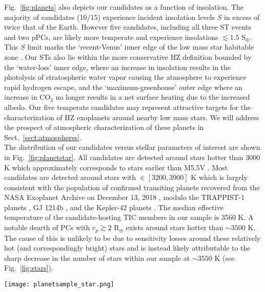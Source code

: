 Fig.~\ref{fig:planets} also depicts our candidates as a function of insolation. The majority of candidates
(10/15) experience incident insolation levels $S$ in excess of twice that of the Earth. However five candidates,
including all three ST events and two pPCs, are likely more temperate and experience insolations
$\lesssim 1.5$ S$_{\oplus}$.
This $S$ limit marks the `recent-Venus' inner edge of the low mass star habitable zone \citep[HZ;][]{kopparapu13}.
Our STs also lie within the more conservative HZ definition bounded by the `water-loss' inner
edge, where an increase in insolation results in the photolysis of stratospheric water vapor causing the atmosphere
to experience rapid hydrogen escape, and the `maximum-greenhouse' outer edge where an increase in CO$_2$ no longer
results in a net surface heating due to the increased albedo. Our five temperate candidates may represent attractive
targets for the characterization of HZ exoplanets around nearby low mass stars. We will address the prospect of
atmospheric characterization of these planets in Sect.~\ref{sect:atmospheres}. \\

The distribution of our candidates versus stellar parameters of interest are shown in
Fig.~\ref{fig:planetstar}. All candidates are detected around stars hotter than 3000 K which
approximately corresponds to stars earlier than M5.5V \citep{pecaut13}. Most candidates
are detected around stars with \teff{} $\in [3200,3900]$ K which is largely consistent with the
population of confirmed transiting planets recovered from the NASA Exoplanet Archive on
December 13, 2018 \citep{akeson13}, modulo the TRAPPIST-1 planets \citep{gillon17}, GJ 1214b
\citep{charbonneau09}, and the Kepler-42 planets \citep{muirhead12b}. The median effective
temperature of the candidate-hosting TIC members in our sample is 3560 K. A notable dearth of PCs
with $r_p \gtrsim 2$ R$_{\oplus}$ exists around stars hotter than $\sim 3500$ K. The cause of
this is unlikely to be due to sensitivity losses around these relatively hot (and correspondingly
bright) stars and is instead likely attributable to the sharp decrease in the number of stars
within our sample at \teff{} $\sim 3550$ K (see Fig.~\ref{fig:stars}). \\

\begin{figure*}
  \centering
  \texttt{[image: planetsample\_star.png]}
  \caption{The planetary radii of our 15 \pipeline{} candidates as functions of their host stellar
    effective temperatures, $J$-band magnitudes, and \gaia{} distances. Our candidates
    are compared to the population of confirmed transiting planets around cool stars (\teff{} $<4200$
    K) from the NASA Exoplanet Archive which are depicted with small black circles.
    The legend labels are planet candidates (PC), 
    putative planet candidates (pPC), 
    single transit events (ST), and  putative single transits (pST).
    TOIs which are also detected by \pipeline{} are highlighted with
    orange diamonds surrounding the associated PC marker. TOIs remaining undetected by \pipeline{}
    are depicted as small orange diamonds.}
  \label{fig:planetstar}
\end{figure*}

